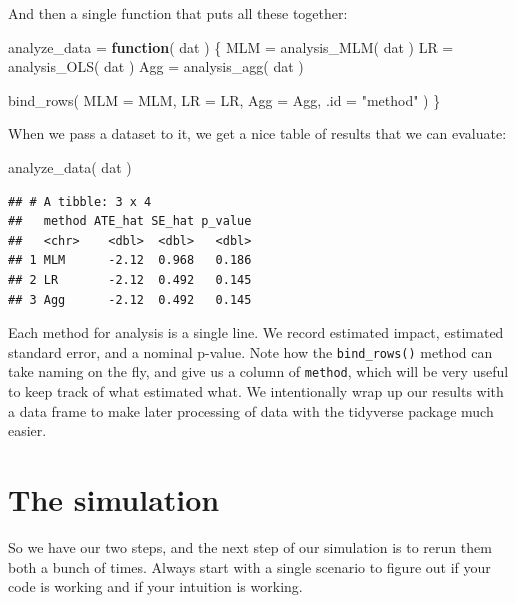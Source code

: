 \documentclass[
]{book}
\newenvironment{Shaded}{\begin{snugshade}}{\end{snugshade}}
\newcommand{\AttributeTok}[1]{\textcolor[rgb]{0.77,0.63,0.00}{#1}}
\newcommand{\ControlFlowTok}[1]{\textcolor[rgb]{0.13,0.29,0.53}{\textbf{#1}}}
\newcommand{\FunctionTok}[1]{\textcolor[rgb]{0.00,0.00,0.00}{#1}}
\newcommand{\NormalTok}[1]{#1}
\newcommand{\OtherTok}[1]{\textcolor[rgb]{0.56,0.35,0.01}{#1}}
\newcommand{\StringTok}[1]{\textcolor[rgb]{0.31,0.60,0.02}{#1}}
\begin{document}
And then a single function that puts all these together:

\begin{Shaded}
\begin{Highlighting}[]
\NormalTok{analyze\_data }\OtherTok{=} \ControlFlowTok{function}\NormalTok{( dat ) \{}
\NormalTok{  MLM }\OtherTok{=} \FunctionTok{analysis\_MLM}\NormalTok{( dat )}
\NormalTok{  LR }\OtherTok{=} \FunctionTok{analysis\_OLS}\NormalTok{( dat )}
\NormalTok{  Agg }\OtherTok{=} \FunctionTok{analysis\_agg}\NormalTok{( dat )}
  
  \FunctionTok{bind\_rows}\NormalTok{( }\AttributeTok{MLM =}\NormalTok{ MLM, }\AttributeTok{LR =}\NormalTok{ LR, }\AttributeTok{Agg =}\NormalTok{ Agg,}
             \AttributeTok{.id =} \StringTok{"method"}\NormalTok{ )}
\NormalTok{\}}
\end{Highlighting}
\end{Shaded}

When we pass a dataset to it, we get a nice table of results that we can evaluate:

\begin{Shaded}
\begin{Highlighting}[]
\FunctionTok{analyze\_data}\NormalTok{( dat )}
\end{Highlighting}
\end{Shaded}

\begin{verbatim}
## # A tibble: 3 x 4
##   method ATE_hat SE_hat p_value
##   <chr>    <dbl>  <dbl>   <dbl>
## 1 MLM      -2.12  0.968   0.186
## 2 LR       -2.12  0.492   0.145
## 3 Agg      -2.12  0.492   0.145
\end{verbatim}

Each method for analysis is a single line. We record estimated impact, estimated standard error, and a nominal p-value.
Note how the \texttt{bind\_rows()} method can take naming on the fly, and give us a column of \texttt{method}, which will be very useful to keep track of what estimated what.
We intentionally wrap up our results with a data frame to make later processing of data with the tidyverse package much easier.

\hypertarget{the-simulation}{%
\section{The simulation}\label{the-simulation}}

So we have our two steps, and the next step of our simulation is to rerun them both a bunch of times.
Always start with a single scenario to figure out if your code is working and if your intuition is working.
\end{document}
